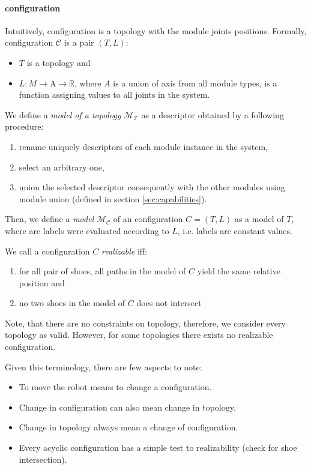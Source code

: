 \paragraph{configuration} Intuitively, configuration is a topology with the
 module joints positions. Formally, configuration $\mathcal{C}$ is a pair $(T,
 L)$:
 \begin{itemize}
    \item $T$ is a topology and
    \item $L: M \rightarrow \text{A} \rightarrow \mathds{R}$, where $A$ is a
    union of axis from all module types, is a function assigning values to all
    joints in the system.
 \end{itemize}

We define a \emph{model of a topology} $\mathcal{M}_\mathcal{T}$ as a descriptor
obtained by a following procedure:
\begin{enumerate}
    \item rename uniquely descriptors of each module instance in the system,
    \item select an arbitrary one,
    \item union the selected descriptor consequently with the other modules
    using module union (defined in section \ref{sec:capabilities}).
\end{enumerate}
Then, we define a \emph{model} $\mathcal{M}_\mathcal{C}$ of an configuration
$C=(T, L)$ as a model of $T$, where are labels were evaluated according to $L$,
i.e. labels are constant values.

We call a configuration $C$ \emph{realizable} iff:
\begin{enumerate}
    \item for all pair of shoes, all paths in the model of $C$ yield the same
    relative position and
    \item no two shoes in the model of $C$ does not intersect
\end{enumerate}

Note, that there are no constraints on topology, therefore, we consider every
topology as valid. However, for some topologies there exists no realizable
configuration.

Given this terminology, there are few aspects to note:
\begin{itemize}
    \item To move the robot means to change a configuration.
    \item Change in configuration can also mean change in topology.
    \item Change in topology always mean a change of configuration.
    \item Every acyclic configuration has a simple test to realizability (check
    for shoe intersection).
\end{itemize}

